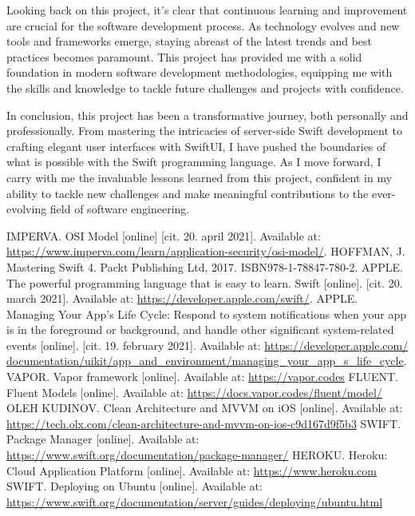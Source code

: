\documentclass[
  biblatex = false,
  language=english,
  figures=false,
  sourcecodes,
  glossaries,
  index
]{kidiplom}
\begin{document}
\begin{kiconclusions}
Looking back on this project, it's clear that continuous learning and improvement are crucial for the software development process. As technology evolves and new tools and frameworks emerge, staying abreast of the latest trends and best practices becomes paramount. This project has provided me with a solid foundation in modern software development methodologies, equipping me with the skills and knowledge to tackle future challenges and projects with confidence.

In conclusion, this project has been a transformative journey, both personally and professionally. From mastering the intricacies of server-side Swift development to crafting elegant user interfaces with SwiftUI, I have pushed the boundaries of what is possible with the Swift programming language. As I move forward, I carry with me the invaluable lessons learned from this project, confident in my ability to tackle new challenges and make meaningful contributions to the ever-evolving field of software engineering.

\end{kiconclusions}


\appendix

\begin{thebibliography}{10}
 \uppercase{Imperva.} OSI Model [online] [cit. 20. april 2021]. Available at: \url{https://www.imperva.com/learn/application-security/osi-model/}.
 \uppercase{Hoffman, J.} Mastering Swift 4. Packt Publishing Ltd, 2017. ISBN978-1-78847-780-2.
 \uppercase{Apple.} The powerful programming language that is easy to learn. Swift [online]. [cit. 20. march 2021]. Available at: \url{https://developer.apple.com/swift/}.
 \uppercase{Apple.} Managing Your App’s Life Cycle: Respond to system notifications when your app is in the foreground or background, and handle other significant system-related events [online]. [cit. 19. february 2021]. Available at: \url{https://developer.apple.com/ documentation/uikit/app_and_environment/managing_your_app_s_life_cycle}.
 \uppercase{Vapor.} Vapor framework [online]. Available at: \url{https://vapor.codes}
 \uppercase{Fluent.} Fluent Models [online]. Available at: \url{https://docs.vapor.codes/fluent/model/}
 \uppercase{Oleh Kudinov.} Clean Architecture and MVVM on iOS [online]. Available at: \url{https://tech.olx.com/clean-architecture-and-mvvm-on-ios-c9d167d9f5b3}
 \uppercase{Swift.} Package Manager [online]. Available at: \url{https://www.swift.org/documentation/package-manager/}
 \uppercase{Heroku.} Heroku: Cloud Application Platform [online]. Available at: \url{https://www.heroku.com}
 \uppercase{Swift.} Deploying on Ubuntu [online]. Available at: \url{https://www.swift.org/documentation/server/guides/deploying/ubuntu.html}
\end{thebibliography}

\end{document}
